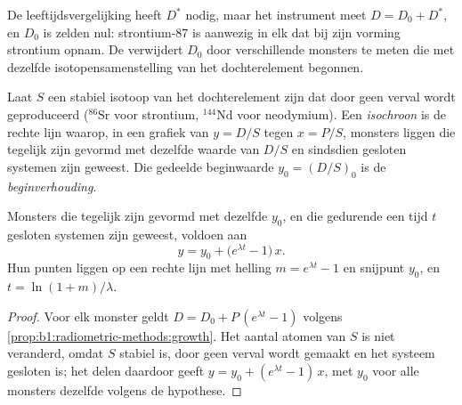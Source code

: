 De leeftijdsvergelijking heeft $D^*$ nodig, maar het instrument meet $D = D_0 + D^*$, en
$D_0$ is zelden nul: strontium-87 is aanwezig in elk  dat bij zijn vorming strontium opnam. De  verwijdert $D_0$ door verschillende monsters te meten die met dezelfde isotopensamenstelling van het dochterelement begonnen.

\begin{definition}\label{def:b1:radiometric-methods:isochron}
Laat $S$ een stabiel isotoop van het dochterelement zijn dat door geen verval wordt geproduceerd ($^{86}\mathrm{Sr}$ voor strontium, $^{144}\mathrm{Nd}$ voor neodymium). Een \emph{isochroon} is de rechte lijn waarop, in een grafiek van $y = D/S$ tegen $x = P/S$, monsters liggen die tegelijk zijn gevormd met dezelfde waarde van $D/S$ en sindsdien gesloten systemen zijn geweest. Die gedeelde beginwaarde $y_0 = (D/S)_0$ is de \emph{beginverhouding}.
\end{definition}

\begin{theorem}[De isochroon]\label{thm:b1:radiometric-methods:isochron}
Monsters die tegelijk zijn gevormd met dezelfde  $y_0$, en die gedurende een tijd $t$ gesloten systemen zijn geweest, voldoen aan
\[
  y = y_0 + \bigl(e^{\lambda t} - 1\bigr)\,x .
\]
Hun punten liggen op een rechte lijn met helling $m = e^{\lambda t} - 1$ en snijpunt $y_0$, en $t = \ln(1+m)/\lambda$.
\end{theorem}

\begin{proof}
Voor elk monster geldt $D = D_0 + P\,(e^{\lambda t} - 1)$ volgens
\cref{prop:b1:radiometric-methods:growth}. Het aantal atomen van $S$ is niet veranderd, omdat $S$ stabiel is, door geen verval wordt gemaakt en het systeem gesloten is; het delen daardoor geeft $y = y_0 + (e^{\lambda t} - 1)\,x$, met $y_0$ voor alle monsters dezelfde volgens de hypothese.
\end{proof}

